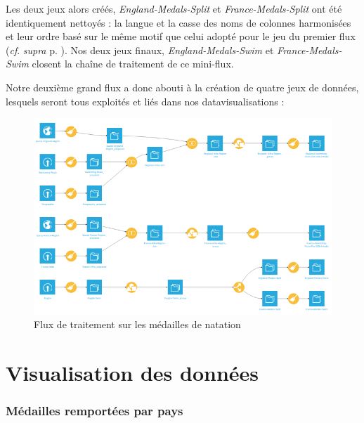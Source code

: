 \documentclass[hidelinks, 12pt]{report}
\begin{document}
Les deux jeux alors créés, \textit{England-Medals-Split} et \textit{France-Medals-Split} ont été identiquement nettoyés : la langue et la casse des noms de colonnes harmonisées et leur ordre basé sur le même motif que celui adopté pour le jeu du premier flux (\textit{cf}. \textit{supra} p. \pageref{orga}). Nos deux jeux finaux, \textit{England-Medals-Swim} et \textit{France-Medals-Swim} closent la chaîne de traitement de ce mini-flux.

Notre deuxième grand flux a donc abouti à la création de quatre jeux de données, lesquels seront tous exploités et liés dans nos datavisualisations :

\begin{center}
	\begin{figure}[H]
		\setlength{\belowcaptionskip}{-35pt}
		\includegraphics[scale=0.55]{images/flow-swim-full.png}
		\caption{Flux de traitement sur les médailles de natation}
	\end{figure}
\end{center}





%





\chapter{Visualisation des données}

\subsection{Médailles remportées par pays}
\end{document}
